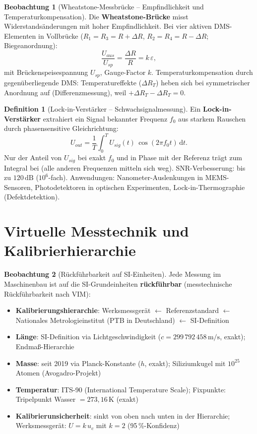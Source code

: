 ﻿\documentclass[a4paper,12pt]{report}
\theoremstyle{definition}
\newtheorem{definition}{Definition}
\newtheorem{beobachtung}{Beobachtung}
\begin{document}
\begin{beobachtung}[Wheatstone-Messbrücke -- Empfindlichkeit und Temperaturkompensation]
Die \textbf{Wheatstone-Brücke} misst Widerstandsänderungen mit hoher Empfindlichkeit.
Bei vier aktiven DMS-Elementen in Vollbrücke ($R_1 = R_3 = R+\Delta R$,
$R_2 = R_4 = R-\Delta R$; Biegeanordnung):
\[
  \frac{U_{aus}}{U_{sp}} = \frac{\Delta R}{R} = k\,\varepsilon,
\]
mit Brückenspeisespannung $U_{sp}$, Gauge-Factor $k$.
Temperaturkompensation durch gegenüberliegende DMS:
Temperatureffekte ($\Delta R_{T}$) heben sich bei symmetrischer Anordnung auf
(Differenzmessung), weil $+\Delta R_T - \Delta R_T = 0$.
\end{beobachtung}

\begin{definition}[Lock-in-Verstärker -- Schwachsignalmessung]
Ein \textbf{Lock-in-Verstärker} extrahiert ein Signal bekannter Frequenz $f_0$
aus starkem Rauschen durch phasensensitive Gleichrichtung:
\[
  U_{out} = \frac{1}{T}\int_0^T U_{sig}(t)\,\cos(2\pi f_0 t)\,\mathrm{d}t.
\]
Nur der Anteil von $U_{sig}$ bei exakt $f_0$ und in Phase mit der Referenz
trägt zum Integral bei (alle anderen Frequenzen mitteln sich weg).
SNR-Verbesserung: bis zu $120\,\mathrm{dB}$ ($10^6$-fach).
Anwendungen: Nanometer-Auslenkungen in MEMS-Sensoren, Photodetektoren
in optischen Experimenten, Lock-in-Thermographie (Defektdetektion).
\end{definition}

\section{Virtuelle Messtechnik und Kalibrierhierarchie}

\begin{beobachtung}[Rückführbarkeit auf SI-Einheiten]
Jede Messung im Maschinenbau ist auf die SI-Grundeinheiten
\textbf{rückführbar} (messtechnische Rückführbarkeit nach VIM):
\begin{itemize}
    \item[-] \textbf{Kalibrierungshierarchie}: Werksmessgerät $\leftarrow$
          Referenzstandard $\leftarrow$ Nationales Metrologieinstitut
          (PTB in Deutschland) $\leftarrow$ SI-Definition
    \item[-] \textbf{Länge}: SI-Definition via Lichtgeschwindigkeit
          ($c = 299\,792\,458\,\mathrm{m/s}$, exakt); Endmaß-Hierarchie
    \item[-] \textbf{Masse}: seit 2019 via Planck-Konstante ($h$, exakt);
          Siliziumkugel mit $10^{25}$ Atomen (Avogadro-Projekt)
    \item[-] \textbf{Temperatur}: ITS-90 (International Temperature Scale);
          Fixpunkte: Tripelpunkt Wasser $= 273{,}16\,\mathrm{K}$ (exakt)
    \item[-] \textbf{Kalibrierunsicherheit}: sinkt von oben nach unten
          in der Hierarchie; Werksmessgerät: $U = k\,u_c$ mit $k=2$
          (95\,\%-Konfidenz)
\end{itemize}
\end{beobachtung}
\end{document}
